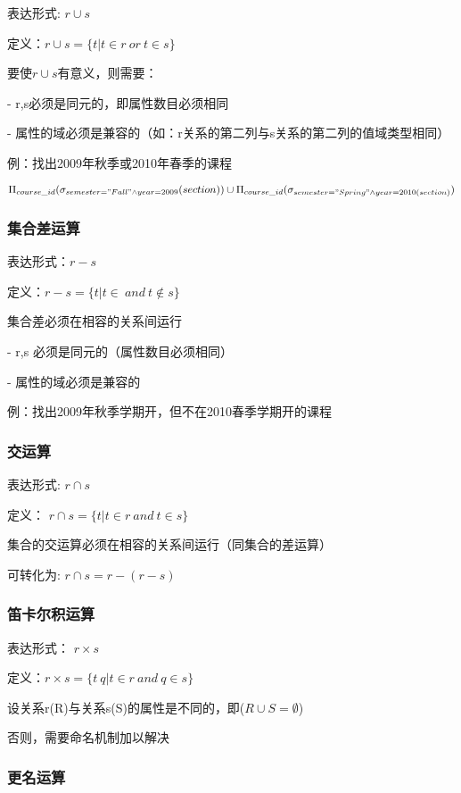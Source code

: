 \documentclass{article}        %
\begin{document}
表达形式: $r\cup s$

定义：$r\cup s = \{ t|t \in r \ or \  t\in s \} $ 

要使$r\cup s$有意义，则需要：

- r,s必须是同元的，即属性数目必须相同

- 属性的域必须是兼容的（如：r关系的第二列与s关系的第二列的值域类型相同）

例：找出2009年秋季或2010年春季的课程

$ \Pi_{course\_id}(\sigma_{semester="Fall" \wedge year=2009}(section)) \cup  
  \Pi_{course\_id}(\sigma_{semester="Spring" \wedge year=2010(section)}) $

\subsubsection{集合差运算}

表达形式：$r - s$ 

定义：$ r - s = \{ t | t \in \ and \ t \notin s \} $

集合差必须在相容的关系间运行

- r,s 必须是同元的（属性数目必须相同）

- 属性的域必须是兼容的

例：找出2009年秋季学期开，但不在2010春季学期开的课程

\subsubsection{交运算}

表达形式: $r \cap s$

定义： $r \cap s = \{ t|t \in r \ and \  t \in s \} $

集合的交运算必须在相容的关系间运行（同集合的差运算）

可转化为: $ r \cap s = r - (r-s) $

\subsubsection{笛卡尔积运算}

表达形式： $r \times s $

定义：$r \times s = \{ t\ q|t \in r \ and\ q \in s\} $

设关系r(R)与关系s(S)的属性是不同的，即($R \cup S = \emptyset$) 

否则，需要命名机制加以解决

\subsubsection{更名运算}
\end{document}
